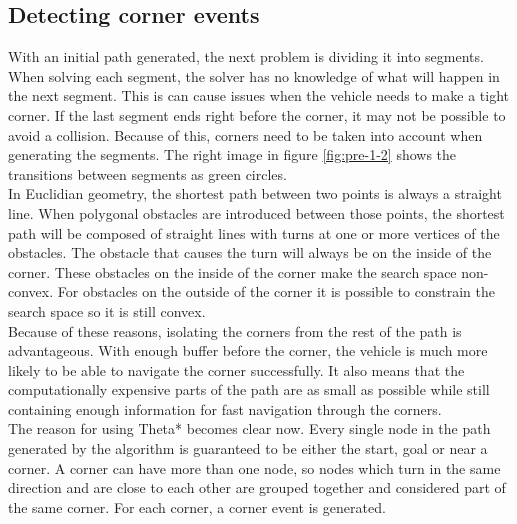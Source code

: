 \subsection{Detecting corner events}
With an initial path generated, the next problem is dividing it into segments. When solving each segment, the solver has no knowledge of what will happen in the next segment. This is can cause issues when the vehicle needs to make a tight corner. If the last segment ends right before the corner, it may not be possible to avoid a collision. Because of this, corners need to be taken into account when generating the segments. The right image in figure \ref{fig:pre-1-2} shows the transitions between segments as green circles.\\
In Euclidian geometry, the shortest path between two points is always a straight line. When polygonal obstacles are introduced between those points, the shortest path will be composed of straight lines with turns at one or more vertices of the obstacles. The obstacle that causes the turn will always be on the inside of the corner. These obstacles on the inside of the corner make the search space non-convex. For obstacles on the outside of the corner it is possible to constrain the search space so it is still convex.\\
Because of these reasons, isolating the corners from the rest of the path is advantageous. With enough buffer before the corner, the vehicle is much more likely to be able to navigate the corner successfully. It also means that the computationally expensive parts of the path are as small as possible while still containing enough information for fast navigation through the corners.
\\
The reason for using Theta* becomes clear now. Every single node in the path generated by the algorithm is guaranteed to be either the start, goal or near a corner. A corner can have more than one node, so nodes which turn in the same direction and are close to each other are grouped together and considered part of the same corner. For each corner, a corner event is generated.

